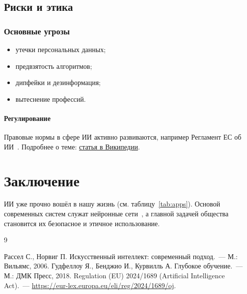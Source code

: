 \documentclass[14pt]{extreport}
\begin{document}
\section{Риски и этика}
\subsection{Основные угрозы}
\begin{itemize}
\item утечки персональных данных;
\item предвзятость алгоритмов;
\item дипфейки и дезинформация;
\item вытеснение профессий.
\end{itemize}
\subsubsection{Регулирование}
Правовые нормы в сфере ИИ активно развиваются, например Регламент ЕС
об ИИ~\cite{euact}. Подробнее о теме:
\href{https://ru.wikipedia.org/wiki/Искусственный_интеллект}{статья в Википедии}.

\chapter*{Заключение}
ИИ уже прочно вошёл в нашу жизнь (см. таблицу~\ref{tab:apps}). Основой
современных систем служат нейронные сети~\cite{goodfellow, russell},
а главной задачей общества становится их безопасное и этичное использование.

\begin{thebibliography}{9}
 Рассел С., Норвиг П. Искусственный интеллект: современный подход.~--- М.: Вильямс, 2006.
 Гудфеллоу Я., Бенджио И., Курвилль А. Глубокое обучение.~--- М.: ДМК Пресс, 2018.
 Regulation (EU) 2024/1689 (Artificial Intelligence Act).~--- \url{https://eur-lex.europa.eu/eli/reg/2024/1689/oj}.
\end{thebibliography}
\end{document}
